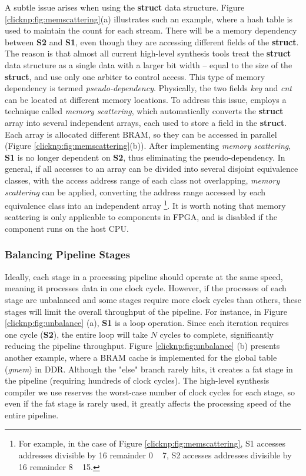 A subtle issue arises when using the \textbf{struct} data structure. 
Figure \ref{clicknp:fig:memscattering}(a) illustrates such an example, where a hash table is used to maintain the count for each stream. 
There will be a memory dependency between \textbf{S2} and \textbf{S1}, even though they are accessing different fields of the \textbf{struct}. 
The reason is that almost all current high-level synthesis tools treat the \textbf{struct} data structure as a single data with a larger bit width -- equal to the size of the \textbf{struct}, and use only one arbiter to control access. 
This type of memory dependency is termed \textit{pseudo-dependency}. 
Physically, the two fields \textit{key} and \textit{cnt} can be located at different memory locations. 
To address this issue, \name employs a technique called \textit{memory scattering}, which automatically converts the \textbf{struct} array into several independent arrays, each used to store a field in the \textbf{struct}. Each array is allocated different BRAM, so they can be accessed in parallel (Figure \ref{clicknp:fig:memscattering}(b)). 
After implementing \textit{memory scattering}, \textbf{S1} is no longer dependent on \textbf{S2}, thus eliminating the pseudo-dependency. 
In general, if all accesses to an array can be divided into several disjoint equivalence classes, with the access address range of each class not overlapping, \textit{memory scattering} can be applied, converting the address range accessed by each equivalence class into an independent array \footnote{For example, in the case of Figure \ref{clicknp:fig:memscattering}, S1 accesses addresses divisible by 16 remainder 0 ~ 7, S2 accesses addresses divisible by 16 remainder 8 ~ 15.}. 
It is worth noting that memory scattering is only applicable to components in FPGA, and is disabled if the component runs on the host CPU.

\subsubsection{Balancing Pipeline Stages}
Ideally, each stage in a processing pipeline should operate at the same speed, meaning it processes data in one clock cycle. However, if the processes of each stage are unbalanced and some stages require more clock cycles than others, these stages will limit the overall throughput of the pipeline. For instance, in Figure \ref {clicknp:fig:unbalance} (a), \textbf {S1} is a loop operation. Since each iteration requires one cycle (\textbf {S2}), the entire loop will take $N$ cycles to complete, significantly reducing the pipeline throughput. Figure \ref {clicknp:fig:unbalance} (b) presents another example, where a BRAM cache is implemented for the global table (\textit {gmem}) in DDR. Although the "else" branch rarely hits, it creates a fat stage in the pipeline (requiring hundreds of clock cycles). The high-level synthesis compiler we use reserves the worst-case number of clock cycles for each stage, so even if the fat stage is rarely used, it greatly affects the processing speed of the entire pipeline.

